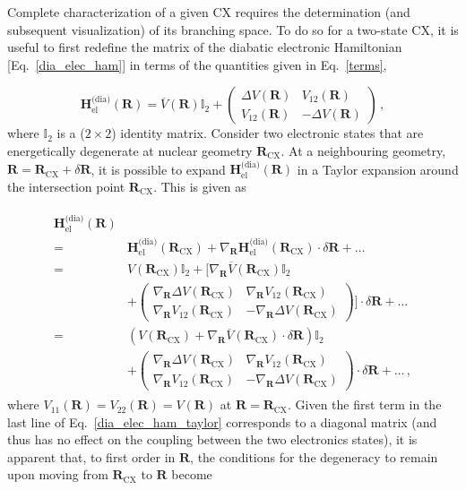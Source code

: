 \documentclass[9pt,bestpractices]{livecoms}
\newcommand{\R}{\mathbf{R}}
\begin{document}
Complete characterization of a given CX requires the determination (and subsequent visualization) of its branching space. 
To do so for a two-state CX, it is useful to first redefine the matrix of the diabatic electronic Hamiltonian [Eq.~\eqref{dia_elec_ham}] in terms of the quantities given in Eq.~\eqref{terms},\cite{domcke_conical_2004, ferre_description_2015}

\begin{equation}
\label{dia_elec_ham_redefine}
    \mathbf{H}_{\text{el}}^{\text{(dia)}}(\R) = \overline{V}(\R)\mathbb{I}_2 + 
    \begin{pmatrix}
        \Delta V(\R) & V_{12}(\R) \\
        V_{12}(\R) & -\Delta V(\R)
    \end{pmatrix} \, ,
\end{equation}
where $\mathbb{I}_2$ is a ($2 \times 2$) identity matrix.
Consider two electronic states that are energetically degenerate at nuclear geometry $\R_\text{CX}$.
At a neighbouring geometry, $\R = \R_\text{CX} + \delta\R$, it is possible to expand $\mathbf{H}_{\text{el}}^{\text{(dia)}}(\R)$ in a Taylor expansion around the intersection point $\R_\text{CX}$. This is given as

\begin{align}
\label{dia_elec_ham_taylor}
\begin{split}
    \mathbf{H}_{\text{el}}^{\text{(dia)}}(\R) & \\ 
    =& \mathbf{H}_{\text{el}}^{\text{(dia)}}(\R_{\text{CX}}) + \nabla_{\R} \mathbf{H}_{\text{el}}^{\text{(dia)}}(\R_{\text{CX}}) \cdot \delta\R + \dots \\
    =& V(\R_{\text{CX}})\mathbb{I}_2 + \Bigg[\nabla_{\R} \overline{V}(\R_{\text{CX}})\mathbb{I}_2 \\ 
    & + 
    \begin{pmatrix}
        \nabla_{\R} \Delta V(\R_{\text{CX}}) & \nabla_{\R} V_{12}(\R_{\text{CX}}) \\
        \nabla_{\R} V_{12}(\R_{\text{CX}}) & -\nabla_{\R} \Delta V(\R_{\text{CX}})
    \end{pmatrix}
    \Bigg] \cdot \delta \R + \dots \\
    =& \left(V(\R_{\text{CX}})  + \nabla_{\R} \overline{V}(\R_{\text{CX}}) \cdot \delta\R \right) \mathbb{I}_2 \\ 
    &+ 
    \begin{pmatrix}
        \nabla_{\R} \Delta V(\R_{\text{CX}}) & \nabla_{\R} V_{12}(\R_{\text{CX}}) \\
        \nabla_{\R} V_{12}(\R_{\text{CX}}) & -\nabla_{\R} \Delta V(\R_{\text{CX}})
    \end{pmatrix}
   \cdot \delta \R + \dots \, ,
\end{split}
\end{align}
where $V_{11}(\R) = V_{22}(\R) = V(\R)$ at $\R = \R_{\text{CX}}$.\cite{sicilia2007quadratic}
Given the first term in the last line of Eq.~\eqref{dia_elec_ham_taylor} corresponds to a diagonal matrix (and thus has no effect on the coupling between the two electronics states), it is apparent that, to first order in $\R$, the conditions for the degeneracy to remain upon moving from $\R_{\text{CX}}$ to $\R$ become 
\end{document}
